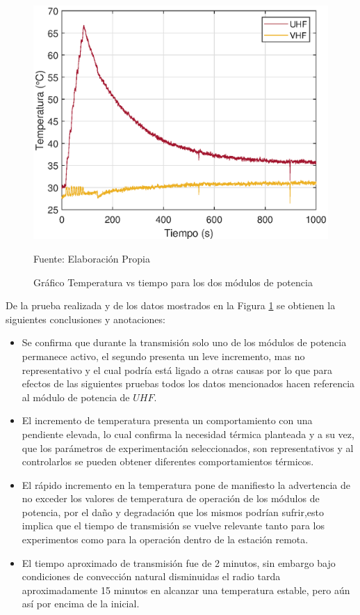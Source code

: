\begin{figure}[H]
\centering
\includegraphics[scale=0.80]{Figuras/preliminar1.eps}
\caption{Gráfico Temperatura vs tiempo para los dos módulos de potencia}
Fuente: Elaboración Propia
\label{preliminar1}
\end{figure}

De la prueba realizada y de los datos mostrados en la Figura \ref{preliminar1} se obtienen la siguientes conclusiones y anotaciones:

\begin{itemize}
    \item Se confirma que durante la transmisión solo uno de los módulos de potencia permanece activo, el segundo presenta un leve incremento, mas no representativo y el cual podría está ligado a otras causas por lo que para efectos de las siguientes pruebas todos los datos mencionados hacen referencia al módulo de potencia de $UHF$.
    \item El incremento de temperatura presenta un comportamiento con una pendiente  elevada, lo cual confirma la necesidad térmica planteada y a su vez, que los parámetros de experimentación seleccionados, son representativos y al controlarlos se pueden obtener diferentes comportamientos térmicos.
    \item El rápido incremento en la temperatura pone de manifiesto la advertencia de no exceder los valores de temperatura de operación de los módulos de potencia, por el daño y degradación que los mismos podrían sufrir,esto implica que el tiempo de transmisión se vuelve relevante tanto para los experimentos como para la operación dentro de la estación remota. 
    \item El tiempo aproximado de transmisión fue de 2 minutos, sin embargo bajo condiciones de convección natural disminuidas el radio tarda aproximadamente 15 minutos en alcanzar una temperatura estable, pero aún así por encima de la inicial.
    
\end{itemize}

